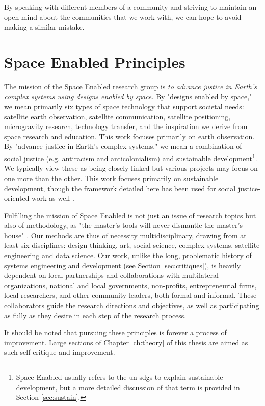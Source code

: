 By speaking with different members of a community and striving to maintain an open mind about the communities that we work with, we can hope to avoid making a similar mistake.

\section{Space Enabled Principles}

The mission of the Space Enabled research group is \textit{to advance justice in Earth's complex systems using designs enabled by space.} By "designs enabled by space," we mean primarily six types of space technology that support societal needs: satellite earth observation, satellite communication, satellite positioning, microgravity research, technology transfer, and the inspiration we derive from space research and education. This work focuses primarily on earth observation. By "advance justice in Earth's complex systems," we mean a combination of social justice (e.g. antiracism and anticolonialism) and sustainable development\footnote{Space Enabled usually refers to the \ac{un} \acp{sdg} to explain sustainable development, but a more detailed discussion of that term is provided in Section \ref{sec:sustain}.}. We typically view these as being closely linked but various projects may focus on one more than the other. This work focuses primarily on sustainable development, though the framework detailed here has been used for social justice-oriented work as well \cite{ovienmhadaEnvironmentVulnerabilityDecisionTechnologyModelingFramework2021}. 

Fulfilling the mission of Space Enabled is not just an issue of research topics but also of methodology, as "the master's tools will never dismantle the master's house" \cite{lordeMasterToolsWill1984}. Our methods are thus of necessity multidisciplinary, drawing from at least six disciplines: design thinking, art, social science, complex systems, satellite engineering and data science. Our work, unlike the long, problematic history of systems engineering and development (see Section \ref{sec:critiques}), is heavily dependent on local partnerships and collaborations with multilateral organizations, national and local governments, non-profits, entrepreneurial firms, local researchers, and other community leaders, both formal and informal. These collaborators guide the research directions and objectives, as well as participating as fully as they desire in each step of the research process.

It should be noted that pursuing these principles is forever a process of improvement. Large sections of Chapter \ref{ch:theory} of this thesis are aimed as such self-critique and improvement. 

